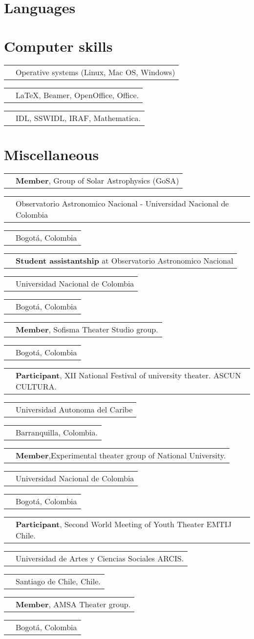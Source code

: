 \documentclass[11pt,letterpaper,sans]{moderncv}        %
\makeatletter
\renewcommand*{\cvitem}[3][.25em]{%
  \begin{tabular}{@{}p{\hintscolumnwidth}@{\hspace{\separatorcolumnwidth}}p{\maincolumnwidth}@{}}%
      \raggedleft\hintstyle{#2} &{#3}%
  \end{tabular}%
  \par\addvspace{#1}}
\makeatother
\begin{document}
\section{Languages}
\section{Computer skills}
\cvitem{Basic}{Operative systems (Linux, Mac OS, Windows)}
\cvitem{Intermediate}{\LaTeX, Beamer, OpenOffice, Office.}
\cvitem{Advanced}{IDL, SSWIDL, IRAF, Mathematica.}

\section{Miscellaneous}
\cvitem{2010-Present}{\textbf{Member}, Group of Solar Astrophysics (GoSA)}
\cvitem{}{Observatorio Astronomico Nacional - Universidad Nacional de Colombia}
\cvitem{}{Bogot\'a, Colombia}
\cvitem{2012 - 2013}{\textbf{Student assistantship} at Observatorio Astronomico Nacional}
\cvitem{}{Universidad Nacional de Colombia}
\cvitem{}{Bogot\'a, Colombia}
\cvitem{2012 - 2013}{\textbf{Member}, Sofisma Theater Studio group.}
\cvitem{}{Bogot\'a, Colombia}
\cvitem{Oct 11 - 17}{\textbf{Participant}, XII National Festival of university theater. ASCUN CULTURA.}
\cvitem{}{Universidad Autonoma del Caribe}
\cvitem{}{Barranquilla, Colombia.}
\cvitem{2009 - 2010}{\textbf{Member},Experimental theater group of National University.}
\cvitem{}{Universidad Nacional de Colombia}
\cvitem{}{Bogot\'a, Colombia}
\cvitem{Jan 29 - 06}{\textbf{Participant}, Second World Meeting of Youth Theater EMTIJ Chile.}
\cvitem{2007}{Universidad de Artes y Ciencias Sociales ARCIS.}
\cvitem{}{Santiago de Chile, Chile.}
\cvitem{2000 - 2007}{\textbf{Member}, AMSA Theater group.}
\cvitem{}{Bogot\'a, Colombia}
\end{document}

